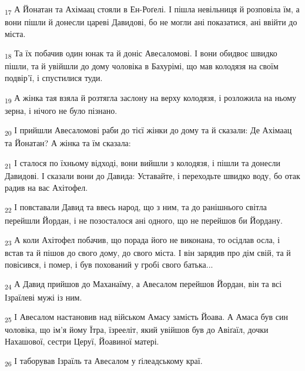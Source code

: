 \begin{tcolorbox}
\textsubscript{17} А Йонатан та Ахімаац стояли в Ен-Роґелі. І пішла невільниця й розповіла їм, а вони пішли й донесли цареві Давидові, бо не могли ані показатися, ані ввійти до міста.
\end{tcolorbox}
\begin{tcolorbox}
\textsubscript{18} Та їх побачив один юнак та й доніс Авесаломові. І вони обидвоє швидко пішли, та й увійшли до дому чоловіка в Бахурімі, що мав колодязя на своїм подвір'ї, і спустилися туди.
\end{tcolorbox}
\begin{tcolorbox}
\textsubscript{19} А жінка тая взяла й розтягла заслону на верху колодязя, і розложила на ньому зерна, і нічого не було пізнано.
\end{tcolorbox}
\begin{tcolorbox}
\textsubscript{20} І прийшли Авесаломові раби до тієї жінки до дому та й сказали: Де Ахімаац та Йонатан? А жінка та їм сказала:
\end{tcolorbox}
\begin{tcolorbox}
\textsubscript{21} І сталося по їхньому відході, вони вийшли з колодязя, і пішли та донесли Давидові. І сказали вони до Давида: Уставайте, і переходьте швидко воду, бо отак радив на вас Ахітофел.
\end{tcolorbox}
\begin{tcolorbox}
\textsubscript{22} І повставали Давид та ввесь народ, що з ним, та до ранішнього світла перейшли Йордан, і не позосталося ані одного, що не перейшов би Йордану.
\end{tcolorbox}
\begin{tcolorbox}
\textsubscript{23} А коли Ахітофел побачив, що порада його не виконана, то осідлав осла, і встав та й пішов до свого дому, до свого міста. І він зарядив про дім свій, та й повісився, і помер, і був похований у гробі свого батька...
\end{tcolorbox}
\begin{tcolorbox}
\textsubscript{24} А Давид прийшов до Маханаїму, а Авесалом перейшов Йордан, він та всі Ізраїлеві мужі із ним.
\end{tcolorbox}
\begin{tcolorbox}
\textsubscript{25} І Авесалом настановив над військом Амасу замість Йоава. А Амаса був син чоловіка, що ім'я йому Їтра, їзрееліт, який увійшов був до Авіґаїл, дочки Нахашової, сестри Церуї, Йоавиної матері.
\end{tcolorbox}
\begin{tcolorbox}
\textsubscript{26} І таборував Ізраїль та Авесалом у ґілеадському краї.
\end{tcolorbox}

